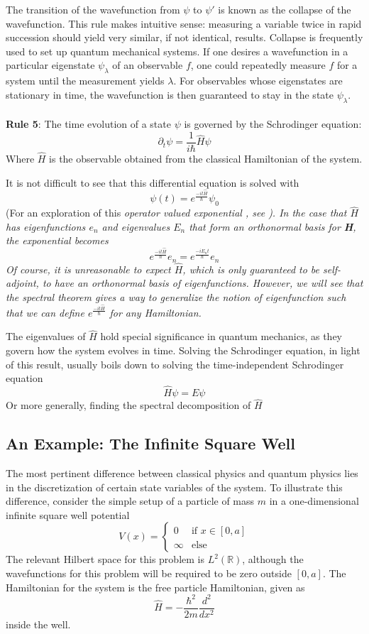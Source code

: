 The transition of the wavefunction from $\psi$ to $\psi '$ is known as the
collapse of the wavefunction. This rule makes intuitive sense: measuring a
variable twice in rapid succession should yield very similar, if not identical,
results. Collapse is frequently used to set up quantum mechanical systems. If
one desires a wavefunction in a particular eigenstate $\psi_{\lambda}$ of an
observable $f$, one could repeatedly measure $f$ for a system until the
measurement yields $\lambda$. For observables whose eigenstates are stationary
in time, the wavefunction is then guaranteed to stay in the state
$\psi_{\lambda}$.
\\
\\
\textbf{Rule 5}: The time evolution of a state $\psi$ is governed by the
Schrodinger equation:
\[
    \partial_t \psi = \frac{1}{i\hbar}\hat{H}\psi
\]
Where $\hat{H}$ is the observable obtained from the classical Hamiltonian of the
system.

It is not difficult to see that this differential equation is solved with
\[
    \psi(t) = e^{\frac{-it\hat{H}}{\hbar}}\psi_0
\]
(For an exploration of this \em operator valued exponential \em, see \cite[p.
74,208]{Hall2013}).
In the case that $\hat{H}$ has eigenfunctions
${e_n}$ and eigenvalues ${E_n}$ that form an orthonormal basis for \textbf{H},
the exponential becomes
\[
    e^{\frac{-it\hat{H}}{\hbar}}e_n = e^{\frac{-iE_nt}{\hbar}}e_n
\]
Of course, it is unreasonable to expect $\hat{H}$, which is only guaranteed to
be self-adjoint, to have an orthonormal basis of eigenfunctions. However, we
will see that the spectral theorem gives a way to generalize the notion of
eigenfunction such that we can define $e^{\frac{-it\hat{H}}{\hbar}}$ for any
Hamiltonian.

The eigenvalues of $\hat{H}$ hold special significance in quantum mechanics, as
they govern how the system evolves in time. Solving the Schrodinger equation, in
light of this result, usually boils down to solving the time-independent
Schrodinger equation
\[
    \hat{H}\psi=E\psi
\]
Or more generally, finding the spectral decomposition of $\hat{H}$


\subsection{An Example: The Infinite Square Well}

The most pertinent difference between classical physics and quantum physics lies
in the discretization of certain state variables of the system. To illustrate
this difference, consider the simple setup of a particle of mass $m$ in a
one-dimensional infinite square well potential
\[
    V(x) =
    \begin{cases}
        0 & \text{if } x\in[0,a]\\  \infty & \text{else}
    \end{cases}
\]
The relevant Hilbert space for this problem is $L^2(\mathbb{R})$, although the
wavefunctions for this problem will be required to be zero outside $[0,a]$.
The Hamiltonian for the system is the free particle Hamiltonian, given as
\[
    \hat{H} = -\frac{\hbar^2}{2m}\frac{d^2}{dx^2}
\]
inside the well.

